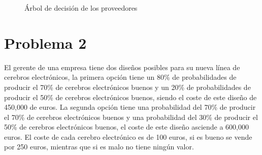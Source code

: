 \documentclass{article}
\begin{document}
            \begin{figure}[!ht]
                \centering
                \caption{Árbol de decisión de los proveedores}
                \label{fig:arbol1}
            \end{figure}

    \section{Problema 2}

        El gerente de una empresa tiene dos diseños posibles para su nueva línea de cerebros electrónicos, la primera opción tiene un 80\% de probabilidades de producir el 70\% de cerebros electrónicos buenos y un 20\% de probabilidades de producir el 50\% de cerebros electrónicos buenos, siendo el coste de este diseño de 450,000 de euros. La segunda opción tiene una probabilidad del 70\% de producir el 70\% de cerebros electrónicos buenos y una probabilidad del 30\% de producir el 50\% de cerebros electrónicos buenos, el coste de este diseño asciende a 600,000 euros. El coste de cada cerebro electrónico es de 100 euros, si es bueno se vende por 250 euros, mientras que si es malo no tiene ningún valor.
        
\end{document}
